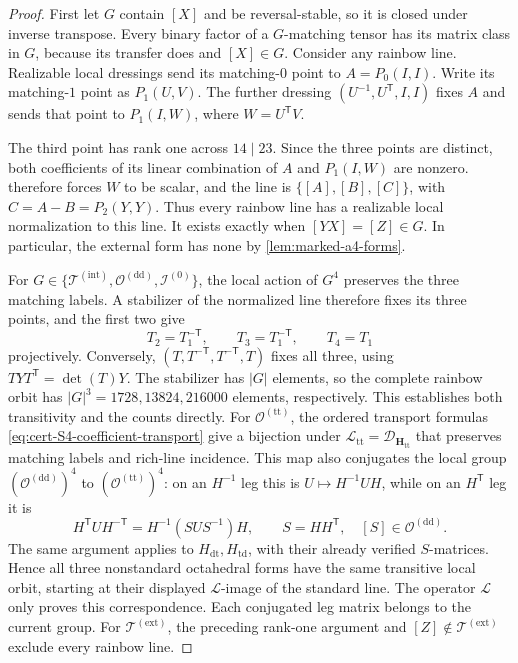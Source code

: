 \documentclass[11pt,letterpaper,onecolumn]{article}
\theoremstyle{plain}
\theoremstyle{definition}
\theoremstyle{remark}
\newcommand{\TetInt}{{\mathcal T^{(\mathrm{int})}}}
\newcommand{\TetExt}{{\mathcal T^{(\mathrm{ext})}}}
\newcommand{\OctDD}{{\mathcal O^{(\mathrm{dd})}}}
\newcommand{\OctTT}{{\mathcal O^{(\mathrm{tt})}}}
\newcommand{\IcoZero}{{\mathcal I^{(0)}}}
\begin{document}
\begin{proof}
First let \(G\) contain \([X]\) and be reversal-stable, so it is closed
under inverse transpose.  Every binary factor of a \(G\)-matching tensor
has its matrix class in \(G\), because its transfer does and \([X]\in G\).
Consider any rainbow line.  Realizable local dressings send its matching-\(0\)
point to \(A=P_0(I,I)\). Write its matching-\(1\) point as \(P_1(U,V)\).
The further dressing \((U^{-1},U^{\mathsf T},I,I)\) fixes \(A\) and sends
that point to \(P_1(I,W)\), where \(W=U^{\mathsf T}V\).

The third point has rank one across \(14\mid23\).  Since the three
points are distinct, both coefficients of its linear combination of
\(A\) and \(P_1(I,W)\) are nonzero.
 therefore forces \(W\) to be scalar,
and the line is \(\{[A],[B],[C]\}\), with \(C=A-B=P_2(Y,Y)\).
Thus every rainbow line has a realizable local normalization to this line.
It exists exactly when \([YX]=[Z]\in G\).  In particular, the external
form has none by \cref{lem:marked-a4-forms}.

For \(G\in\{\TetInt,\OctDD,\IcoZero\}\), the local action of
\(G^4\) preserves the three matching labels.  A stabilizer of the
normalized line therefore fixes its three points, and the first two give
\[
 T_2=T_1^{-\mathsf T},\qquad T_3=T_1^{-\mathsf T},\qquad T_4=T_1
\]
projectively.  Conversely, \((T,T^{-\mathsf T},T^{-\mathsf T},T)\)
fixes all three, using \(TYT^{\mathsf T}=\det(T)Y\).
The stabilizer has \(|G|\) elements, so the complete rainbow orbit has
\(|G|^3=1728,13824,216000\) elements, respectively.  This establishes both
transitivity and the counts directly.
For \(\OctTT\), the ordered transport formulas
\cref{eq:cert-S4-coefficient-transport} give a bijection under
\(\mathcal L_{\mathrm{tt}}=\mathscr D_{\mathbf H_{\mathrm{tt}}}\)
that preserves matching labels and rich-line incidence. This map also
conjugates the local group \((\OctDD)^4\) to \((\OctTT)^4\):
on an \(H^{-1}\) leg this is \(U\mapsto H^{-1}UH\), while on an
\(H^{\mathsf T}\) leg it is
\[
 H^{\mathsf T}UH^{-\mathsf T}
 =H^{-1}(SUS^{-1})H,\qquad S=HH^{\mathsf T},\quad [S]\in\OctDD.
\]
The same argument applies to \(H_{\mathrm{dt}},H_{\mathrm{td}}\), with their already
verified \(S\)-matrices.  Hence all three nonstandard octahedral forms
have the same transitive local orbit, starting at their displayed
\(\mathcal L\)-image of the standard line.  The operator \(\mathcal L\)
only proves this correspondence. Each conjugated leg matrix belongs to the
current group.  For \(\TetExt\), the preceding rank-one argument and
\([Z]\notin\TetExt\) exclude every rainbow line.


\end{proof}
\end{document}
